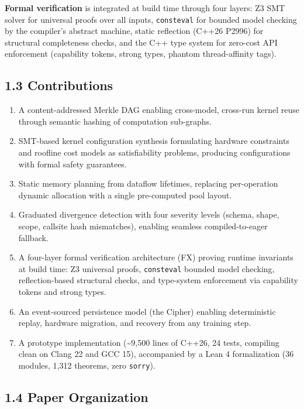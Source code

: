 \textbf{Formal verification} is integrated at build time through four layers: Z3 SMT solver for universal proofs over all inputs, \texttt{consteval} for bounded model checking by the compiler's abstract machine, static reflection (C++26 P2996) for structural completeness checks, and the C++ type system for zero-cost API enforcement (capability tokens, strong types, phantom thread-affinity tags).

\subsection{1.3 Contributions}\label{contributions}

\begin{enumerate}
\def\labelenumi{\arabic{enumi}.}
\tightlist
\item
  A content-addressed Merkle DAG enabling cross-model, cross-run kernel reuse through semantic hashing of computation sub-graphs.
\item
  SMT-based kernel configuration synthesis formulating hardware constraints and roofline cost models as satisfiability problems, producing configurations with formal safety guarantees.
\item
  Static memory planning from dataflow lifetimes, replacing per-operation dynamic allocation with a single pre-computed pool layout.
\item
  Graduated divergence detection with four severity levels (schema, shape, scope, callsite hash mismatches), enabling seamless compiled-to-eager fallback.
\item
  A four-layer formal verification architecture (FX) proving runtime invariants at build time: Z3 universal proofs, \texttt{consteval} bounded model checking, reflection-based structural checks, and type-system enforcement via capability tokens and strong types.
\item
  An event-sourced persistence model (the Cipher) enabling deterministic replay, hardware migration, and recovery from any training step.
\item
  A prototype implementation (\textasciitilde9,500 lines of C++26, 24 tests, compiling clean on Clang 22 and GCC 15), accompanied by a Lean 4 formalization (36 modules, 1,312 theorems, zero \texttt{sorry}).
\end{enumerate}

\subsection{1.4 Paper Organization}\label{paper-organization}

